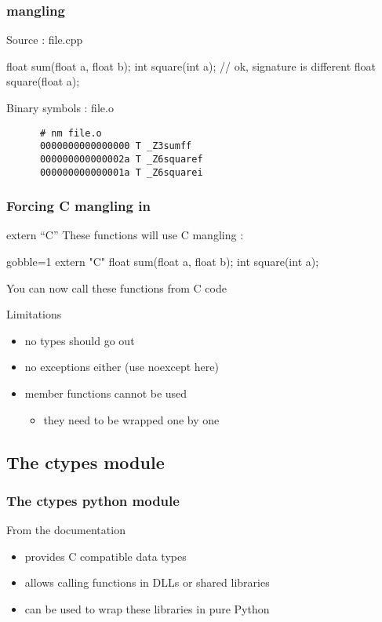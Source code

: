 \begin{frame}[fragile]
  \frametitle{\cpp mangling}
  \begin{exampleblock}{Source : file.cpp}
    \begin{cppcode*}{}
      float sum(float a, float b);
      int square(int a);
      // ok, signature is different
      float square(float a);
    \end{cppcode*}
  \end{exampleblock}
  \begin{block}{Binary symbols : file.o}
    \begin{verbatim}
      # nm file.o
      0000000000000000 T _Z3sumff
      000000000000002a T _Z6squaref
      000000000000001a T _Z6squarei
    \end{verbatim}
  \end{block}  
\end{frame}

\begin{frame}[fragile]
  \frametitle{Forcing C mangling in \cpp}
  \begin{block}{extern ``C''}
    These functions will use C mangling :
    \begin{cppcode*}{gobble=1}
      extern "C" {
        float sum(float a, float b);
        int square(int a);
      }
    \end{cppcode*}
  \end{block}
  \pause
  You can now call these \cpp functions from C code
  \pause
  \begin{alertblock}{Limitations}
    \begin{itemize}
    \item no \cpp types should go out
    \item no exceptions either (use noexcept here)
    \item member functions cannot be used
      \begin{itemize}
      \item they need to be wrapped one by one
      \end{itemize}
    \end{itemize}
  \end{alertblock}
\end{frame}

\subsection[ctypes]{The ctypes module}

\begin{frame}[fragile]
  \frametitle{The ctypes python module}
  \begin{block}{From the documentation}
    \begin{itemize}
    \item provides C compatible data types
    \item allows calling functions in DLLs or shared libraries
    \item can be used to wrap these libraries in pure Python
    \end{itemize}
  \end{block}
\end{frame}

